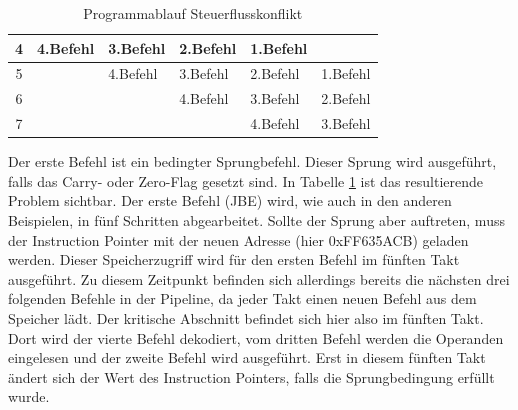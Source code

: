 \documentclass[a4paper,12pt]{article}
\begin{document}
\begin{table}[]
\begin{tabular}{|c|l|l|l|l|l|}
4             & \cellcolor[HTML]{FFFE65}4.Befehl                                                        & \cellcolor[HTML]{67FD9A}3.Befehl                                                           & \cellcolor[HTML]{38FFF8}2.Befehl                                                            & \cellcolor[HTML]{9698ED}1.Befehl        &                                                                                               \\ \hline
5             & \cellcolor[HTML]{FFFFFF}                                                                & \cellcolor[HTML]{FFFE65}4.Befehl                                                           & \cellcolor[HTML]{67FD9A}3.Befehl                                                            & \cellcolor[HTML]{38FFF8}2.Befehl        & \cellcolor[HTML]{9698ED}1.Befehl                                                              \\ \hline
6             &                                                                                         & \cellcolor[HTML]{FFFFFF}                                                                   & \cellcolor[HTML]{FFFE65}4.Befehl                                                            & \cellcolor[HTML]{67FD9A}3.Befehl        & \cellcolor[HTML]{38FFF8}2.Befehl                                                              \\ \hline
7             &                                                                                         &                                                                                            & \cellcolor[HTML]{FFFFFF}                                                                    & \cellcolor[HTML]{FFFE65}4.Befehl        & \cellcolor[HTML]{67FD9A}3.Befehl                                                              \\ \hline
\end{tabular}
\caption{Programmablauf Steuerflusskonflikt}
\label{tab:Steuerflusskonflikt}

\end{table}

\newpage\noindent Der erste Befehl ist ein bedingter Sprungbefehl. Dieser Sprung wird ausgeführt, falls das Carry- oder Zero-Flag gesetzt sind. In Tabelle \ref{tab:Steuerflusskonflikt} ist das resultierende Problem sichtbar. Der erste Befehl (JBE) wird, wie auch in den anderen Beispielen, in fünf Schritten abgearbeitet. Sollte der Sprung aber auftreten, muss der Instruction Pointer mit der neuen Adresse (hier 0xFF635ACB) geladen werden. Dieser Speicherzugriff wird für den ersten Befehl im fünften Takt ausgeführt. Zu diesem Zeitpunkt befinden sich allerdings bereits die nächsten drei folgenden Befehle in der Pipeline, da jeder Takt einen neuen Befehl aus dem Speicher lädt. Der kritische Abschnitt befindet sich hier also im fünften Takt. Dort wird der vierte Befehl dekodiert, vom dritten Befehl werden die Operanden eingelesen und der zweite Befehl wird ausgeführt. Erst in diesem fünften Takt ändert sich der Wert des Instruction Pointers, falls die Sprungbedingung erfüllt wurde. 
\end{document}

